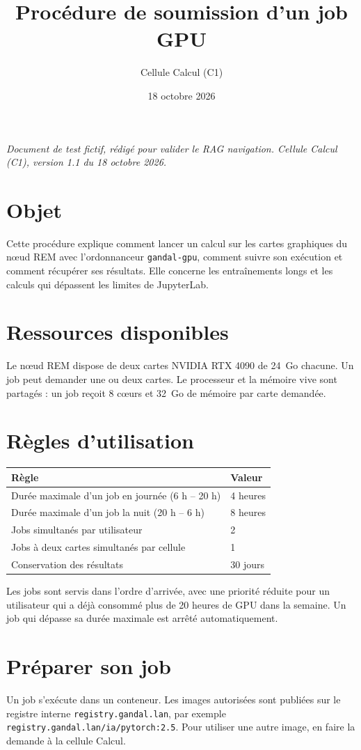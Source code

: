 \documentclass[11pt,a4paper]{article}
\title{Procédure de soumission d'un job GPU}
\author{Cellule Calcul (C1)}
\date{18 octobre 2026}
\begin{document}
\maketitle

\emph{Document de test fictif, rédigé pour valider le RAG navigation. Cellule Calcul (C1), version 1.1 du 18 octobre 2026.}

\section{Objet}
Cette procédure explique comment lancer un calcul sur les cartes graphiques du nœud REM avec l'ordonnanceur \texttt{gandal-gpu}, comment suivre son exécution et comment récupérer ses résultats. Elle concerne les entraînements longs et les calculs qui dépassent les limites de JupyterLab.

\section{Ressources disponibles}
Le nœud REM dispose de deux cartes NVIDIA RTX 4090 de 24~Go chacune. Un job peut demander une ou deux cartes. Le processeur et la mémoire vive sont partagés : un job reçoit 8 cœurs et 32~Go de mémoire par carte demandée.

\section{Règles d'utilisation}
\begin{tabular}{|l|l|}
\hline
Règle & Valeur \\
\hline
Durée maximale d'un job en journée (6 h -- 20 h) & 4 heures \\
Durée maximale d'un job la nuit (20 h -- 6 h) & 8 heures \\
Jobs simultanés par utilisateur & 2 \\
Jobs à deux cartes simultanés par cellule & 1 \\
Conservation des résultats & 30 jours \\
\hline
\end{tabular}

Les jobs sont servis dans l'ordre d'arrivée, avec une priorité réduite pour un utilisateur qui a déjà consommé plus de 20 heures de GPU dans la semaine. Un job qui dépasse sa durée maximale est arrêté automatiquement.

\section{Préparer son job}
Un job s'exécute dans un conteneur. Les images autorisées sont publiées sur le registre interne \texttt{registry.gandal.lan}, par exemple \texttt{registry.gandal.lan/ia/pytorch:2.5}. Pour utiliser une autre image, en faire la demande à la cellule Calcul.
\end{document}
